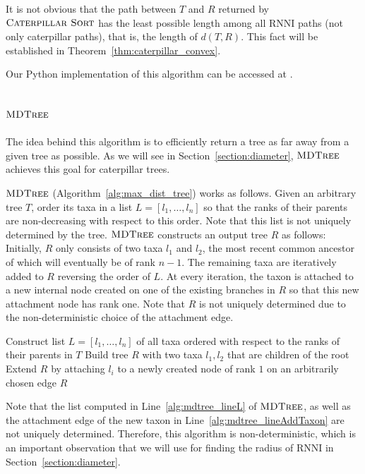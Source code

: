 \documentclass{amsart}
\newcommand{\rnni}{\mathrm{RNNI}}
\newcommand{\csort}{\textsc{Caterpillar Sort}}
\newcommand{\mdtree}{\textsc{MDTree}}
\begin{document}
It is not obvious that the path between $T$ and $R$ returned by $\csort$ has the least possible length among all $\rnni$ paths (not only caterpillar paths), that is, the length of $d(T, R)$.
This fact will be established in Theorem~\ref{thm:caterpillar_convex}.

Our Python implementation of this algorithm can be accessed at \autocite{Collienne2019}.


\subsection{$\mdtree$}
\label{section:alg_mdtree}

The idea behind this algorithm is to efficiently return a tree as far away from a given tree as possible.
As we will see in Section~\ref{section:diameter}, $\mdtree$ achieves this goal for caterpillar trees.

$\mdtree$ (Algorithm~\ref{alg:max_dist_tree}) works as follows.
Given an arbitrary tree $T$, order its taxa in a list $L = [l_1, \ldots, l_n]$ so that the ranks of their parents are non-decreasing with respect to this order.
Note that this list is not uniquely determined by the tree.
$\mdtree$ constructs an output tree $R$ as follows:
Initially, $R$ only consists of two taxa $l_1$ and $l_2$, the most recent common ancestor of which will eventually be of rank $n - 1$.
The remaining taxa are iteratively added to $R$ reversing the order of $L$.
At every iteration, the taxon is attached to a new internal node created on one of the existing branches in $R$ so that this new attachment node has rank one.
Note that $R$ is not uniquely determined due to the non-deterministic choice of the attachment edge.

\begin{algorithm}[H]
\caption{$\mdtree(T)$}
\label{alg:max_dist_tree}
\begin{algorithmic}[1]
\STATE Construct list $L=[l_1, \ldots, l_n]$ of all taxa ordered with respect to the ranks of their parents in $T$
\label{alg:mdtree_lineL}
\STATE Build tree $R$ with two taxa $l_1, l_2$ that are children of the root
\STATE Extend $R$ by attaching $l_i$ to a newly created node of rank $1$ on an arbitrarily chosen edge
\label{alg:mdtree_lineAddTaxon}
\ENDFOR
\RETURN $R$
\end{algorithmic}
\end{algorithm}

Note that the list computed in Line~\ref{alg:mdtree_lineL} of $\mdtree$, as well as the attachment edge of the new taxon in Line~\ref{alg:mdtree_lineAddTaxon} are not uniquely determined.
Therefore, this algorithm is non-deterministic, which is an important observation that we will use for finding the radius of $\rnni$ in Section~\ref{section:diameter}.
\end{document}
